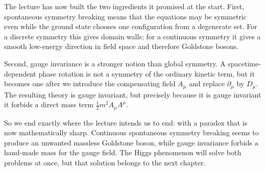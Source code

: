 The lecture has now built the two ingredients it promised at the start. First, spontaneous symmetry breaking means that the equations may be symmetric even while the ground state chooses one configuration from a degenerate set. For a discrete symmetry this gives domain walls; for a continuous symmetry it gives a smooth low-energy direction in field space and therefore Goldstone bosons.

Second, gauge invariance is a stronger notion than global symmetry. A spacetime-dependent phase rotation is not a symmetry of the ordinary kinetic term, but it becomes one after we introduce the compensating field \(A_\mu\) and replace \(\partial_\mu\) by \(D_\mu\). The resulting theory is gauge invariant, but precisely because it is gauge invariant it forbids a direct mass term \(\tfrac12 m^2 A_\mu A^\mu\).

So we end exactly where the lecture intends us to end: with a paradox that is now mathematically sharp. Continuous spontaneous symmetry breaking seems to produce an unwanted massless Goldstone boson, while gauge invariance forbids a hand-made mass for the gauge field. The Higgs phenomenon will solve both problems at once, but that solution belongs to the next chapter.